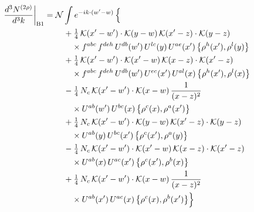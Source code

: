 \documentclass[10pt]{article}
\numberwithin{equation}{section}
\newcommand{\KK}{\mathcal K}
\newcommand{\NN}{\mathcal N}
\begin{document}
\begin{align}
\frac{d^3N^{(2\rho)}}{d^3k}\bigg|_{\rm B1}={}&\NN\int e^{-ik\cdot(w'-w)}\,\Big\{\notag\\
&\quad +\tfrac14\,\KK(x'-w')\cdot\KK(y-w)\,\KK(x'-z)\cdot\KK(y-z)\notag\\
&\qquad\times f^{abc}\,f^{deh}\,U^{db}(w')\,U^{lc}(y)\,U^{ae}(x')\,\big\{\rho^{h}(x'),\rho^{l}(y)\big\}\notag\\
&\quad +\tfrac14\,\KK(x'-w')\cdot\KK(x'-w)\,\KK(x-z)\cdot\KK(x'-z)\notag\\
&\qquad\times f^{abc}\,f^{deh}\,U^{db}(w')\,U^{ec}(x')\,U^{al}(x)\,\big\{\rho^{h}(x'),\rho^{l}(x)\big\}\notag\\
&\quad -\tfrac14\,N_{c}\,\KK(x'-w')\cdot\KK(x-w)\,\frac{1}{(x-z)^2}\notag\\
&\qquad\times U^{ab}(w')\,U^{bc}(x)\,\big\{\rho^{c}(x),\rho^{a}(x')\big\}\notag\\
&\quad +\tfrac14\,N_{c}\,\KK(x'-w')\cdot\KK(y-w)\,\KK(x'-z)\cdot\KK(y-z)\notag\\
&\qquad\times U^{ab}(y)\,U^{bc}(x')\,\big\{\rho^{c}(x'),\rho^{a}(y)\big\}\notag\\
&\quad -\tfrac14\,N_{c}\,\KK(x'-w')\cdot\KK(x'-w)\,\KK(x-z)\cdot\KK(x'-z)\notag\\
&\qquad\times U^{ab}(x)\,U^{ac}(x')\,\big\{\rho^{c}(x'),\rho^{b}(x)\big\}\notag\\
&\quad +\tfrac14\,N_{c}\,\KK(x'-w')\cdot\KK(x-w)\,\frac{1}{(x-z)^2}\notag\\
&\qquad\times U^{ab}(x')\,U^{ac}(x)\,\big\{\rho^{c}(x),\rho^{b}(x')\big\}\Big\}\label{R:eq:sum-B1}
\end{align}
\end{document}
